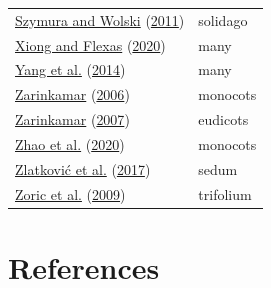 \documentclass[
  10pt,
]{article}
\begin{document}
\begin{longtable}[]{@{}ll@{}}
\protect\hyperlink{ref-szymura_leaf_2011}{Szymura and Wolski} (\protect\hyperlink{ref-szymura_leaf_2011}{2011}) & solidago \\
\protect\hyperlink{ref-xiong_one_2020}{Xiong and Flexas} (\protect\hyperlink{ref-xiong_one_2020}{2020}) & many \\
\protect\hyperlink{ref-yang_large-scale_2014}{Yang et al.} (\protect\hyperlink{ref-yang_large-scale_2014}{2014}) & many \\
\protect\hyperlink{ref-zarinkamar_density_2006}{Zarinkamar} (\protect\hyperlink{ref-zarinkamar_density_2006}{2006}) & monocots \\
\protect\hyperlink{ref-zarinkamar_stomatal_2007}{Zarinkamar} (\protect\hyperlink{ref-zarinkamar_stomatal_2007}{2007}) & eudicots \\
\protect\hyperlink{ref-zhao_difference_2020}{Zhao et al.} (\protect\hyperlink{ref-zhao_difference_2020}{2020}) & monocots \\
\protect\hyperlink{ref-zlatkovic_epidermal_2017}{Zlatković et al.} (\protect\hyperlink{ref-zlatkovic_epidermal_2017}{2017}) & sedum \\
\protect\hyperlink{ref-zoric_leaf_2009}{Zoric et al.} (\protect\hyperlink{ref-zoric_leaf_2009}{2009}) & trifolium \\
\bottomrule
\end{longtable}

\clearpage

\hypertarget{references}{%
\section*{References}\label{references}}
\end{document}
